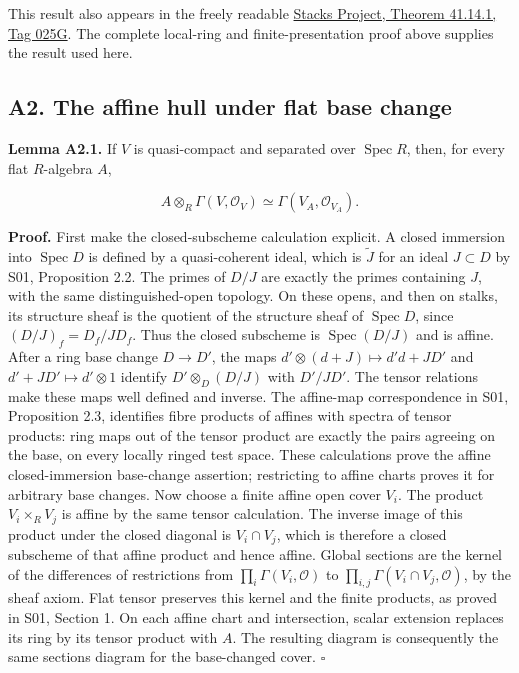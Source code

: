 \documentclass[11pt,a4paper,openany]{report}
\begin{document}
This result also appears in the freely readable \href{https://stacks.math.columbia.edu/tag/025G}{Stacks Project, Theorem 41.14.1, Tag 025G}. The complete local-ring and finite-presentation proof above supplies the result used here.

\subsection{A2. The affine hull under flat base change}\label{AG-RG-S04-a2.-the-affine-hull-under-flat-base-change}

\textbf{Lemma A2.1.} If \(V\) is quasi-compact and separated over \(\operatorname{Spec}R\), then, for every flat \(R\)-algebra \(A\),

\[
A\otimes_R\Gamma(V,\mathcal O_V)
\simeq\Gamma(V_A,\mathcal O_{V_A}).
\]

\textbf{Proof.} First make the closed-subscheme calculation explicit. A closed immersion into \(\operatorname{Spec}D\) is defined by a quasi-coherent ideal, which is \(\widetilde J\) for an ideal \(J\subset D\) by S01, Proposition 2.2. The primes of \(D/J\) are exactly the primes containing \(J\), with the same distinguished-open topology. On these opens, and then on stalks, its structure sheaf is the quotient of the structure sheaf of \(\operatorname{Spec}D\), since \((D/J)_f=D_f/JD_f\). Thus the closed subscheme is \(\operatorname{Spec}(D/J)\) and is affine. After a ring base change \(D\to D'\), the maps \(d'\otimes(d+J)\mapsto d'd+JD'\) and \(d'+JD'\mapsto d'\otimes1\) identify \(D'\otimes_D(D/J)\) with \(D'/JD'\). The tensor relations make these maps well defined and inverse. The affine-map correspondence in S01, Proposition 2.3, identifies fibre products of affines with spectra of tensor products: ring maps out of the tensor product are exactly the pairs agreeing on the base, on every locally ringed test space. These calculations prove the affine closed-immersion base-change assertion; restricting to affine charts proves it for arbitrary base changes. Now choose a finite affine open cover \(V_i\). The product \(V_i\times_R V_j\) is affine by the same tensor calculation. The inverse image of this product under the closed diagonal is \(V_i\cap V_j\), which is therefore a closed subscheme of that affine product and hence affine. Global sections are the kernel of the differences of restrictions from \(\prod_i\Gamma(V_i,\mathcal O)\) to \(\prod_{i,j}\Gamma(V_i\cap V_j,\mathcal O)\), by the sheaf axiom. Flat tensor preserves this kernel and the finite products, as proved in S01, Section 1. On each affine chart and intersection, scalar extension replaces its ring by its tensor product with \(A\). The resulting diagram is consequently the same sections diagram for the base-changed cover. \(\square\)
\end{document}

